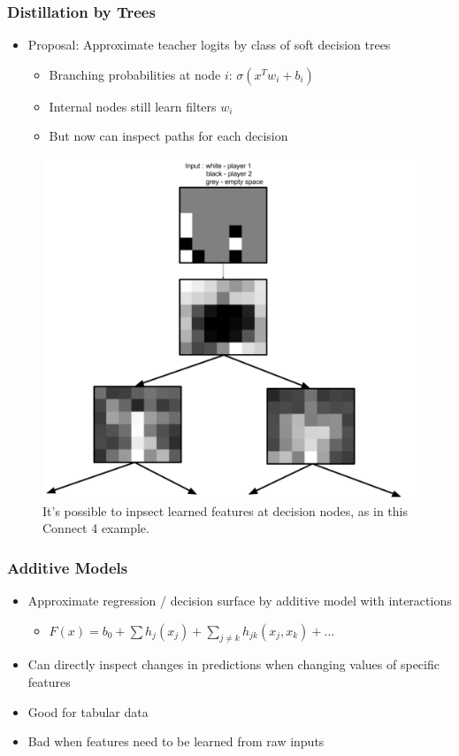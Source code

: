 \documentclass[10pt,mathserif]{beamer}
\begin{document}
\begin{frame}
  \frametitle{Distillation by Trees}
  \begin{itemize}
  \item Proposal: Approximate teacher logits by class of soft decision trees
    \begin{itemize}
    \item Branching probabilities at node $i$: $\sigma\left(x^{T}w_i +
      b_i\right)$
    \item Internal nodes still learn filters $w_i$
    \item But now can inspect paths for each decision
    \end{itemize}
  \end{itemize}
\begin{figure}[ht]
  \centering
  \includegraphics[width=0.4\paperwidth]{figure/connect4}
  \caption{It's possible to inpsect learned features at decision nodes, as in
    this Connect 4 example. \label{fig:connect4} }
\end{figure}

\end{frame}

\begin{frame}
  \frametitle{Additive Models}
  \begin{itemize}
  \item Approximate regression / decision surface by additive model with
    interactions
    \begin{itemize}
    \item $F\left(x\right) = b_0 + \sum h_{j} \left(x_j\right) + \sum_{j \neq k} h_{jk}\left(x_{j}, x_{k}\right) + \dots$
    \end{itemize}
  \item Can directly inspect changes in predictions when changing values of
    specific features
  \item Good for tabular data
  \item Bad when features need to be learned from raw inputs
  \end{itemize}
\end{frame}
\end{document}
